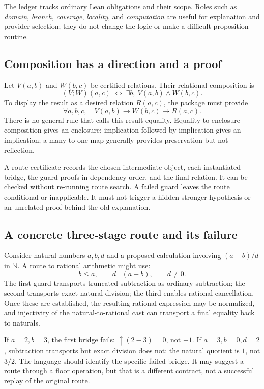\documentclass[11pt,letterpaper]{article}
\newcommand{\N}{\mathbb N}
\numberwithin{equation}{section}
\begin{document}
The ledger tracks ordinary Lean obligations and their scope. Roles such as
\emph{domain}, \emph{branch}, \emph{coverage}, \emph{locality}, and \emph{computation}
are useful for explanation and provider selection; they do not change the logic
or make a difficult proposition routine.

\subsection{Composition has a direction and a proof}
Let $V(a,b)$ and $W(b,c)$ be certified relations. Their relational composition is
\[
 (V;W)(a,c)\;\Longleftrightarrow\;
 \exists b,\ V(a,b)\land W(b,c).
\]
To display the result as a desired relation $R(a,c)$, the package must provide
\[
 \forall a,b,c,\quad V(a,b)\to W(b,c)\to R(a,c).
\]
There is no general rule that calls this result equality. Equality-to-enclosure
composition gives an enclosure; implication followed by implication gives an
implication; a many-to-one map generally provides preservation but not reflection.

A route certificate records the chosen intermediate object, each instantiated
bridge, the guard proofs in dependency order, and the final relation. It can be
checked without re-running route search. A failed guard leaves the route
conditional or inapplicable. It must not trigger a hidden stronger hypothesis or
an unrelated proof behind the old explanation.

\subsection{A concrete three-stage route and its failure}
Consider natural numbers $a,b,d$ and a proposed calculation involving
$(a-b)/d$ in $\N$. A route to rational arithmetic might use:
\[
 b\le a,\qquad d\mid(a-b),\qquad d\ne0.
\]
The first guard transports truncated subtraction as ordinary subtraction; the
second transports exact natural division; the third enables rational
cancellation. Once these are established, the resulting rational expression may
be normalized, and injectivity of the natural-to-rational cast can transport a
final equality back to naturals.

If $a=2,b=3$, the first bridge fails: $\uparrow(2-3)=0$, not $-1$. If
$a=3,b=0,d=2$, subtraction transports but exact division does not: the natural
quotient is $1$, not $3/2$. The language should identify the specific failed
bridge. It may suggest a route through a floor operation, but that is a different
contract, not a successful replay of the original route.
\end{document}
